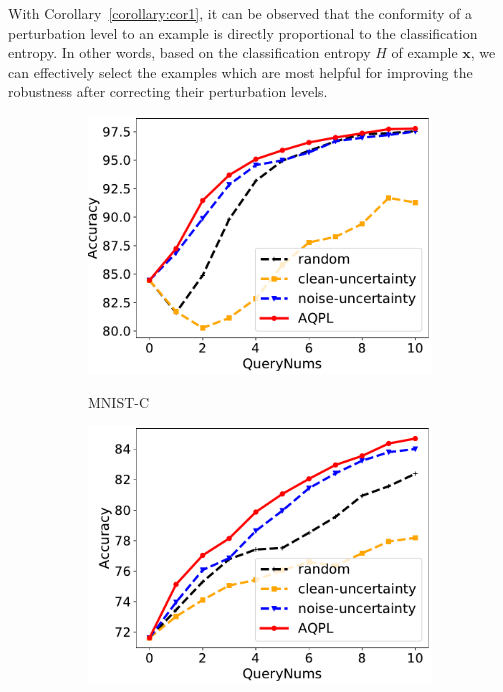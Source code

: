 \documentclass[letterpaper]{article} %
\begin{document}
With Corollary~\ref{corollary:cor1}, it can be observed that the conformity of a perturbation level to an example is directly proportional to the classification entropy. In other words, based on the classification entropy $H$ of example $\mathbf{x}$, we can effectively select the examples which are most helpful for improving the robustness after correcting their perturbation levels.


\begin{figure}[!t]
\centering

\begin{subfigure}{0.3\linewidth}
\centering
\label{fig.Mnist.Gaussian}
\includegraphics[width=1\textwidth]{img/Resnet18-Mnist-GuassianNoise.pdf}\\
\caption{MNIST-C}
\end{subfigure}
\begin{subfigure}{0.3\linewidth}
\centering
\label{fig.Cifar10.Gaussian}
\includegraphics[width=1\textwidth]{img/Resnet18-CIFAR10-GuassianNoise.pdf}\\

\end{subfigure}
\end{figure}
\end{document}

